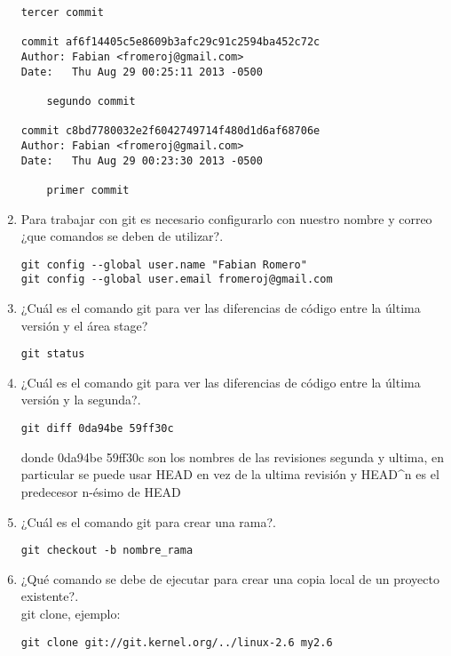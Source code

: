 \documentclass[12pt]{article}
\begin{document}
\begin{enumerate}
\begin{lstlisting}[frame=single]
    tercer commit

commit af6f14405c5e8609b3afc29c91c2594ba452c72c
Author: Fabian <fromeroj@gmail.com>
Date:   Thu Aug 29 00:25:11 2013 -0500

    segundo commit

commit c8bd7780032e2f6042749714f480d1d6af68706e
Author: Fabian <fromeroj@gmail.com>
Date:   Thu Aug 29 00:23:30 2013 -0500

    primer commit
\end{lstlisting}


  \item Para trabajar con git es necesario configurarlo con nuestro nombre y correo ¿que comandos se deben de utilizar?. \hfill \\

\begin{lstlisting}[frame=single] 
git config --global user.name "Fabian Romero" 
git config --global user.email fromeroj@gmail.com 
\end{lstlisting}

  \item  ¿Cuál es el comando git para ver las diferencias de código entre la última versión y el área stage? \hfill \\
\begin{lstlisting}[frame=single] 
git status
\end{lstlisting}
  \item ¿Cuál es el comando git para ver las diferencias de código entre la última versión y la segunda?.  \hfill \\
\begin{lstlisting}[frame=single] 
git diff 0da94be 59ff30c
\end{lstlisting}
donde 0da94be 59ff30c son los nombres de las revisiones segunda y ultima, en particular se puede usar HEAD en vez de la ultima revisión y HEAD\^{}n es el predecesor n-ésimo de HEAD

  \item ¿Cuál es el comando git para crear una rama?.  \hfill \\

\begin{lstlisting}[frame=single] 
git checkout -b nombre_rama
\end{lstlisting}

  \item  ¿Qué comando se debe de ejecutar para crear una copia local de un proyecto existente?. \hfill \\
git clone, ejemplo:
\begin{lstlisting}[frame=single] 
git clone git://git.kernel.org/../linux-2.6 my2.6
\end{lstlisting}


\end{enumerate}
\end{document}
